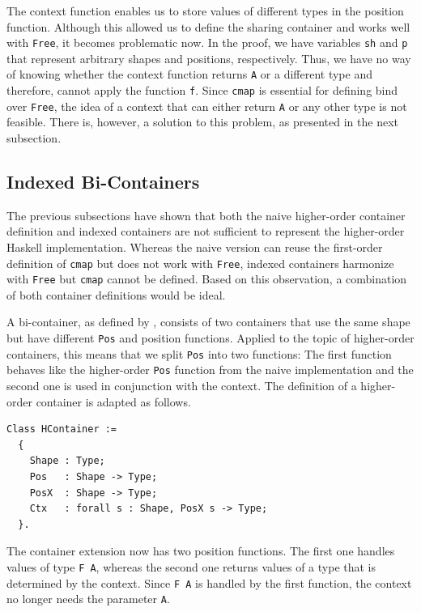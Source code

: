 \documentclass[a4paper, 11pt, fleqn, twoside, abstract=on]{scrreprt}
\newcommand{\cinl}[1]{\texttt{#1}}
\begin{document}
The context function enables us to store values of different types in the position function.
Although this allowed us to define the sharing container and works well with \cinl{Free}, it becomes problematic now.
In the proof, we have variables \cinl{sh} and \cinl{p} that represent arbitrary shapes and positions, respectively.
Thus, we have no way of knowing whether the context function returns \cinl{A} or a different type and therefore, cannot apply the function \cinl{f}.
Since \cinl{cmap} is essential for defining bind over \cinl{Free}, the idea of a context that can either return \cinl{A} or any other type is not feasible.
There is, however, a solution to this problem, as presented in the next subsection.

\subsection{Indexed Bi-Containers}
The previous subsections have shown that both the naive higher-order container definition and indexed containers are not sufficient to represent the higher-order Haskell implementation.
Whereas the naive version can reuse the first-order definition of \cinl{cmap} but does not work with \cinl{Free}, indexed containers harmonize with \cinl{Free} but \cinl{cmap} cannot be defined.
Based on this observation, a combination of both container definitions would be ideal.

A bi-container, as defined by \citet{ghani2007higherDimensional}, consists of two containers that use the same shape but have different \cinl{Pos} and position functions.
Applied to the topic of higher-order containers, this means that we split \cinl{Pos} into two functions: The first function behaves like the higher-order \cinl{Pos} function from the naive implementation and the second one is used in conjunction with the context.
The definition of a higher-order container is adapted as follows.

\begin{verbatim}
Class HContainer :=
  {
    Shape : Type;
    Pos   : Shape -> Type;
    PosX  : Shape -> Type;
    Ctx   : forall s : Shape, PosX s -> Type;
  }.
\end{verbatim}
\noindent
The container extension now has two position functions.
The first one handles values of type \cinl{F A}, whereas the second one returns values of a type that is determined by the context.
Since \cinl{F A} is handled by the first function, the context no longer needs the parameter \cinl{A}.
\end{document}
